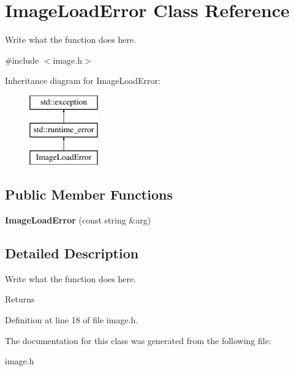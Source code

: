\hypertarget{classImageLoadError}{\section{Image\+Load\+Error Class Reference}
\label{classImageLoadError}
}


Write what the function does here.  




{\ttfamily \#include $<$image.\+h$>$}

Inheritance diagram for Image\+Load\+Error\+:\begin{figure}[H]
\begin{center}
\leavevmode
\includegraphics[height=3.000000cm]{classImageLoadError}
\end{center}
\end{figure}
\subsection*{Public Member Functions}
\begin{DoxyCompactItemize}
\item 
\hypertarget{classImageLoadError_a578b21971e45108555b175a9638b388d}{{\bfseries Image\+Load\+Error} (const string \&arg)}\label{classImageLoadError_a578b21971e45108555b175a9638b388d}

\end{DoxyCompactItemize}


\subsection{Detailed Description}
Write what the function does here. 

\begin{DoxyReturn}{Returns}

\end{DoxyReturn}


Definition at line 18 of file image.\+h.



The documentation for this class was generated from the following file\+:\begin{DoxyCompactItemize}
\item 
image.\+h\end{DoxyCompactItemize}
